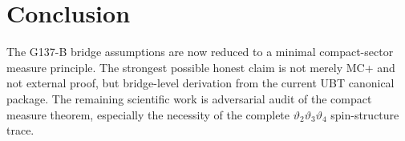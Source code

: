 \documentclass[12pt,a4paper]{article}
\begin{document}
\section{Conclusion}

The G137-B bridge assumptions are now reduced to a minimal compact-sector
measure principle.  The strongest possible honest claim is not merely MC+ and
not external proof, but bridge-level derivation from the current UBT canonical
package.  The remaining scientific work is adversarial audit of the compact
measure theorem, especially the necessity of the complete
$\vartheta_2\vartheta_3\vartheta_4$ spin-structure trace.
\end{document}

